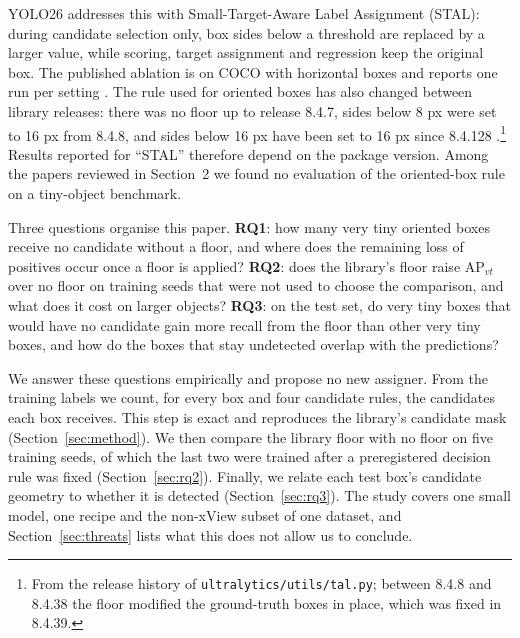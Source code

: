 \documentclass[11pt]{article}
\begin{document}
YOLO26 \cite{yolo26} addresses this with Small-Target-Aware Label Assignment (STAL): during candidate selection only,
box sides below a threshold are replaced by a larger value, while scoring, target assignment and regression keep the
original box. The published ablation is on COCO with horizontal boxes and reports one run per setting
\cite[Table~6]{yolo26}. The rule used for oriented boxes has also changed between library releases: there was no floor
up to release 8.4.7, sides below 8 px were set to 16 px from 8.4.8, and sides below 16 px have been set to 16 px since
8.4.128 \cite{ultralytics}.\footnote{From the release history of \texttt{ultralytics/utils/tal.py}; between 8.4.8 and
8.4.38 the floor modified the ground-truth boxes in place, which was fixed in 8.4.39.} Results reported for ``STAL''
therefore depend on the package version. Among the papers reviewed in Section~2 we found no evaluation of the
oriented-box rule on a tiny-object benchmark.

Three questions organise this paper. \textbf{RQ1}: how many very tiny oriented boxes receive no candidate without a floor,
and where does the remaining loss of positives occur once a floor is applied? \textbf{RQ2}: does the library's floor raise
AP$_{vt}$ over no floor on training seeds that were not used to choose the comparison, and what does it cost on larger
objects? \textbf{RQ3}: on the test set, do very tiny boxes that would have no candidate gain more recall from the floor than
other very tiny boxes, and how do the boxes that stay undetected overlap with the predictions?

We answer these questions empirically and propose no new assigner. From the training labels we count, for every box and
four candidate rules, the candidates each box receives. This step is exact and reproduces the library's candidate mask
(Section~\ref{sec:method}). We then compare the library floor with no floor on five training seeds, of which the last two
were trained after a preregistered decision rule was fixed (Section~\ref{sec:rq2}). Finally, we relate each test box's
candidate geometry to whether it is detected (Section~\ref{sec:rq3}). The study covers one small model, one recipe and the
non-xView subset of one dataset, and Section~\ref{sec:threats} lists what this does not allow us to conclude.
\end{document}
